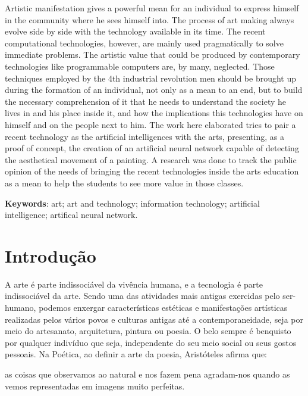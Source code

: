 \documentclass[12pt, a4paper]{article}
\renewenvironment{abstract}
  {\small\quotation
  {\bfseries\noindent{\small\abstractname}\par\nobreak\smallskip}}
  {\endquotation}
\begin{document}
\begin{abstract}
\noindent
Artistic manifestation gives a powerful mean for an individual to express himself in the community where he sees himself into. 
The process of art making always evolve side by side with the technology available in its time.
The recent computational technologies, however, are mainly used pragmatically to solve immediate problems.
The artistic value that could be produced by contemporary technologies like programmable computers are, by many, neglected.
Those techniques employed by the 4th industrial revolution men should be brought up during the formation of an individual, not only as a mean to an end, but to build the necessary comprehension of it that he needs to understand the society he lives in and his place inside it, and how the implications this technologies have on himself and on the people next to him.
The work here elaborated tries to pair a recent technology as the artificial intelligences with the arts, presenting, as a proof of concept, the creation of an artificial neural network capable of detecting the aesthetical movement of a painting. A research was done to track the public opinion of the needs of bringing the recent technologies inside the arts education as a mean to help the students to see more value in those classes.

\noindent
\textbf{Keywords}: art; art and technology; information technology; artificial intelligence; artifical neural network.
\end{abstract}

\newpage
\section{Introdução}
A arte é parte indissociável da vivência humana, e a tecnologia é parte indissociável da arte. 
Sendo uma das atividades mais antigas exercidas pelo ser-humano, podemos enxergar características estéticas e manifestações artísticas realizadas pelos vários povos e culturas antigas até a contemporaneidade, seja por meio do artesanato, arquitetura, pintura ou poesia.
O belo sempre é benquisto por qualquer indivíduo que seja, independente do seu meio social ou seus gostos pessoais.
Na Poética, ao definir a arte da poesia, Aristóteles afirma que:

\begin{displayquote}
as coisas que observamos ao natural e nos fazem pena agradam-nos quando as vemos representadas em imagens muito perfeitas.
\cite[p.42]{aristotle_poetics}
\end{displayquote}
\end{document}

